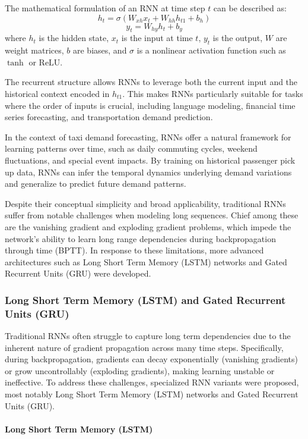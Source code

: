 \documentclass{article}
\begin{document}
The mathematical formulation of an RNN at time step \(t\) can be described as:
\[
h_t = \sigma(W_{xh}x_t + W_{hh}h_{t 1} + b_h)
\]
\[
y_t = W_{hy}h_t + b_y
\]
where \(h_t\) is the hidden state, \(x_t\) is the input at time \(t\), \(y_t\) is the output, \(W\) are weight matrices, \(b\) are biases, and \(\sigma\) is a nonlinear activation function such as \(\tanh\) or \(\mathrm{ReLU}\).

The recurrent structure allows RNNs to leverage both the current input and the historical context encoded in \(h_{t 1}\). This makes RNNs particularly suitable for tasks where the order of inputs is crucial, including language modeling, financial time series forecasting, and transportation demand prediction.

In the context of taxi demand forecasting, RNNs offer a natural framework for learning patterns over time, such as daily commuting cycles, weekend fluctuations, and special event impacts\cite{xu_2018_realtime}. By training on historical passenger pick up data, RNNs can infer the temporal dynamics underlying demand variations and generalize to predict future demand patterns.

Despite their conceptual simplicity and broad applicability, traditional RNNs suffer from notable challenges when modeling long sequences. Chief among these are the vanishing gradient and exploding gradient problems, which impede the network’s ability to learn long range dependencies during backpropagation through time (BPTT). In response to these limitations, more advanced architectures such as Long Short Term Memory (LSTM) networks and Gated Recurrent Units (GRU) were developed.
\newpage
\subsubsection{Long Short Term Memory (LSTM) and Gated Recurrent Units (GRU)}

Traditional RNNs often struggle to capture long term dependencies due to the inherent nature of gradient propagation across many time steps. Specifically, during backpropagation, gradients can decay exponentially (vanishing gradients) or grow uncontrollably (exploding gradients), making learning unstable or ineffective. To address these challenges, specialized RNN variants were proposed, most notably Long Short Term Memory (LSTM) networks and Gated Recurrent Units (GRU)\cite{arunkumar_2022_comparative}.

\paragraph{Long Short Term Memory (LSTM)}
\end{document}
